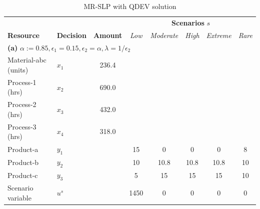 \documentclass[7pt]{article}
\begin{document}
\begin{table}[h!]
    \centering
    \footnotesize
    \caption{\small{MR-SLP with QDEV solution}}
    \begin{tabular}{ll|c|ccccc}
        \toprule
        \multicolumn{3}{l|}{} & \multicolumn{5}{c}{\textbf{Scenarios }$s$}                                                                                                         \\
        \textbf{Resource}     & \textbf{Decision}                          & \textbf{Amount} & \textit{Low} & \textit{Moderate} & \textit{High} & \textit{Extreme} & \textit{Rare} \\
        \midrule
        \multicolumn{8}{l}{\textbf{(a)} $\alpha := 0.85, \epsilon_1 = 0.15, \epsilon_2 = \alpha, \lambda = 1/\epsilon_2 $}                                                         \\
        \midrule
        Material-abc (units)  & $x_1$                                      & 236.4           &              &                   &               &                  &               \\
        Process-1 (hrs)       & $x_2$                                      & 690.0           &              &                   &               &                  &               \\
        Process-2 (hrs)       & $x_3$                                      & 432.0           &              &                   &               &                  &               \\
        Process-3 (hrs)       & $x_4$                                      & 318.0           &              &                   &               &                  &               \\
        Product-a             & $y_1$                                      &                 & 15           & 0                 & 0             & 0                & 8             \\
        Product-b             & $y_2$                                      &                 & 10           & 10.8              & 10.8          & 10.8             & 10            \\
        Product-c             & $y_3$                                      &                 & 5            & 15                & 15            & 15               & 10            \\
        Scenario variable     & $u^s$                                      &                 & 1450         & 0                 & 0             & 0                & 0             \\

\end{tabular}
\end{table}
\end{document}
